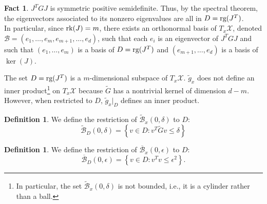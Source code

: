 \documentclass[entropy,article,submit,pdftex,moreauthors]{Definitions/mdpi}
\theoremstyle{plain}
\theoremstyle{definition}
\newtheorem{definition}[theorem]{Definition}
\newtheorem{fact}[theorem]{Fact}
\newcommand{\B}{\mathcal{B}}
\newcommand{\X}{\mathcal{X}}
\newcommand{\rg}{\textnormal{rg}}
\newcommand{\rk}{\textnormal{rk}}
\begin{document}
\begin{fact}
    \label{fact2}
    $J^T G J$ is symmetric positive semidefinite. Thus, by the spectral theorem, the eigenvectors associated to its nonzero eigenvalues are all in $D = \rg(J^T)$. \\
    In particular, since $\rk(J)=m$, there exists an orthonormal basis of $T_x\X$, denoted $\B = (e_1, \dots, e_m, e_{m+1}, \dots, e_d)$, such that each $e_i$ is an eigenvector of $J^T G J$ and such that $(e_1, \dots, e_m)$ is a basis of $D = \rg(J^T)$ and $(e_{m+1}, \dots, e_d)$ is a basis of $\ker(J)$.
\end{fact}
The set $D = \rg(J^T)$ is a $m$-dimensional subspace of $T_x\X$. $\tilde{g}_x$ does not define an inner product\footnote{In particular, the set $\widetilde{\B}_x(0, \delta)$ is not bounded, i.e., it is a cylinder rather than a ball.} on $T_x\X$ because $\widetilde{G}$ has a nontrivial kernel of dimension $d-m$. However, when restricted to $D$, $\tilde{g}_x|_D$ defines an inner product.
\begin{definition}
    We define the restriction of $\widetilde{\B}_x(0, \delta)$ to $D$:
    \begin{equation*}
        \widetilde{\B}_D(0, \delta) = \left\{v \in D : v^T \widetilde{G} v \leq \delta \right\}
    \end{equation*}
\end{definition}

\begin{definition}
    We define the restriction of $\overline{\B}_x(0, \epsilon)$ to $D$:
    \begin{equation*}
        \overline{\B}_D(0, \epsilon) = \left\{v \in D : v^T v \leq \epsilon^2 \right\}.
    \end{equation*}
\end{definition}
\end{document}
